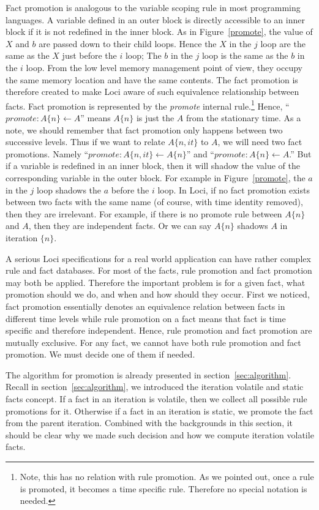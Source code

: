 \documentclass{article}
\begin{document}
Fact promotion is analogous to the variable scoping rule in most
programming languages. A variable defined in an outer block is
directly accessible to an inner block if it is not redefined in the
inner block. As in Figure~\ref{promote}, the value of $X$ and $b$ are
passed down to their child loops. Hence the $X$ in the $j$
loop are the same as the $X$ just before the $i$ loop; The $b$ in the
$j$ loop is the same as the $b$ in the $i$ loop. From the low level
memory management point of view, they occupy the same memory location
and have the same contents. The fact promotion is therefore created to
make Loci aware of such equivalence relationship between facts. Fact
promotion is represented by the {\it promote} internal
rule.\footnote{Note, this has no relation with rule promotion. As we
  pointed out, once a rule is promoted, it becomes a time
  specific rule. Therefore no special notation is needed.} Hence,
``$promote: A\{n\} \gets A$'' means $A\{n\}$ is just the $A$ from the
stationary time. As a note, we should remember that fact promotion
only happens between two successive levels. Thus if we want to relate
$A\{n,it\}$ to $A$, we will need two fact promotions. Namely 
``$promote: A\{n,it\} \gets A\{n\}$'' and 
``$promote: A\{n\} \gets A$.''
But if a variable is redefined in an inner block,
then it will shadow the value of the corresponding variable in the
outer block. For example in Figure~\ref{promote}, the $a$ in the $j$
loop shadows the $a$ before the $i$ loop. In Loci, if no fact
promotion exists between two facts with the same name (of course, with
time identity removed), then they are irrelevant. For example, if
there is no promote rule between $A\{n\}$ and $A$, then they are
independent facts. Or we can say $A\{n\}$ shadows $A$ in iteration
$\{n\}$. 

A serious Loci specifications for a real world application can have
rather complex rule and fact databases. For most of the facts, rule
promotion and fact promotion may both be applied. Therefore the
important problem is for a given fact, what promotion should we do,
and when and how should they occur. First we noticed, fact promotion
essentially denotes an equivalence relation between facts in different
time levels while rule promotion on a fact means that fact is time
specific and therefore independent. Hence, rule promotion and fact
promotion are mutually
exclusive. For any fact, we cannot have both rule promotion and fact
promotion. We must decide one of them if needed. 

The algorithm for promotion is already presented in
section~\ref{sec:algorithm}. Recall in section~\ref{sec:algorithm}, we
introduced the iteration volatile and static facts concept. If a fact
in an iteration is volatile, then we collect all possible rule
promotions for it. Otherwise if a fact in an iteration is static, we
promote the fact from the parent iteration. Combined with the
backgrounds in this section, it should be clear why we made such
decision and how we compute iteration volatile facts. 
\end{document}
